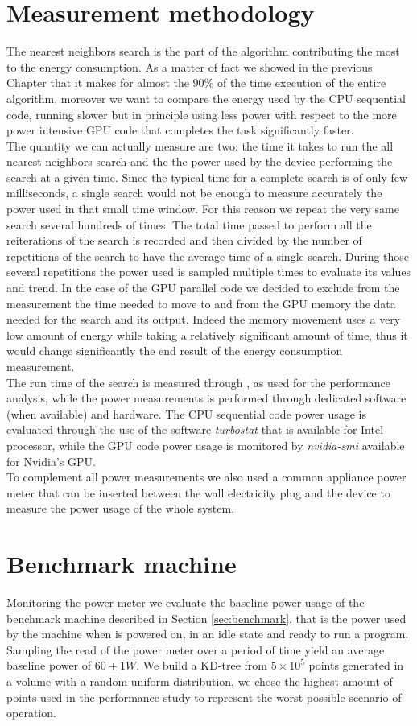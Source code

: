 \section{Measurement methodology}
The nearest neighbors search is the part of the algorithm contributing the most to the energy consumption. As a matter of fact we showed in the previous Chapter that it makes for almost the $90\%$ of the time execution of the entire algorithm, moreover we want to compare the energy used by the CPU sequential code, running slower but in principle using less power with respect to the more power intensive GPU code that completes the task significantly faster.\\ 
The quantity we can actually measure are two: the time it takes to run the all nearest neighbors search and the the power used by the device performing the search at a given time.
Since the typical time for a complete search is of only few milliseconds, a single search would not be enough to measure accurately the power used in that small time window. For this reason we repeat the very same search several hundreds of times. The total time passed to perform all the reiterations of the search is recorded and then divided by the number of repetitions of the search to have the average time of a single search. During those several repetitions the power used is sampled multiple times to evaluate its values and trend. In the case of the GPU parallel code we decided to exclude from the measurement the time needed to move to and from the GPU memory the data needed for the search and its output. Indeed the memory movement uses a very low amount of energy while taking a relatively significant amount of time, thus it would change significantly the end result of the energy consumption measurement.\\
The run time of the search is measured through , as used for the performance analysis, while the power measurements is performed through dedicated software (when available) and hardware. The CPU sequential code power usage is evaluated through the use of the software \textit{turbostat} that is available for Intel processor, while the GPU code power usage is monitored by \textit{nvidia-smi} available for Nvidia's GPU.\\
To complement all power measurements we also used a common appliance power meter that can be inserted between the wall electricity plug and the device to measure the power usage of the whole system.

\section{Benchmark machine}
Monitoring the power meter we evaluate the baseline power usage of the benchmark machine described in Section \ref{sec:benchmark}, that is the power used by the machine when is powered on, in an idle state and ready to run a program. Sampling the read of the power meter over a period of time yield an average baseline power of $60 \pm 1 \unit{W}$.
We build a KD-tree from $5 \times 10^5$ points generated in a volume with a random uniform distribution, we chose the highest amount of points used in the performance study to represent the worst possible scenario of operation.

